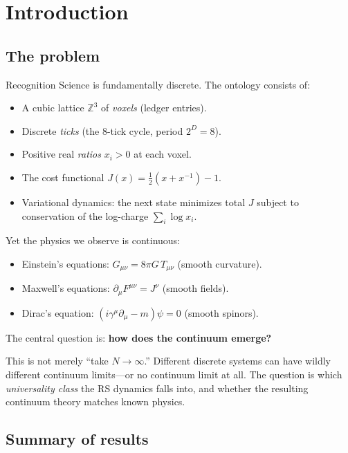 \documentclass[11pt,a4paper]{article}
\theoremstyle{plain}
\theoremstyle{definition}
\theoremstyle{remark}
\newcommand{\Z}{\mathbb{Z}}
\newcommand{\Jcost}{J}
\begin{document}
\tableofcontents
\newpage

\section{Introduction}
\label{sec:intro}

\subsection{The problem}

Recognition Science is fundamentally discrete.  The ontology consists of:
\begin{itemize}[nosep]
\item A cubic lattice $\Z^3$ of \emph{voxels} (ledger entries).
\item Discrete \emph{ticks} (the 8-tick cycle, period $2^D = 8$).
\item Positive real \emph{ratios} $x_i > 0$ at each voxel.
\item The cost functional $\Jcost(x) = \tfrac12(x + x^{-1}) - 1$.
\item Variational dynamics: the next state minimizes total $\Jcost$
  subject to conservation of the log-charge $\sum_i \log x_i$.
\end{itemize}

Yet the physics we observe is continuous:
\begin{itemize}[nosep]
\item Einstein's equations: $G_{\mu\nu} = 8\pi G\, T_{\mu\nu}$ (smooth curvature).
\item Maxwell's equations: $\partial_\mu F^{\mu\nu} = J^\nu$ (smooth fields).
\item Dirac's equation: $(i\gamma^\mu\partial_\mu - m)\psi = 0$ (smooth spinors).
\end{itemize}

The central question is: \textbf{how does the continuum emerge?}

This is not merely ``take $N \to \infty$.''  Different discrete systems
can have wildly different continuum limits---or no continuum limit at all.
The question is which \emph{universality class} the RS dynamics falls
into, and whether the resulting continuum theory matches known physics.

\subsection{Summary of results}
\end{document}
